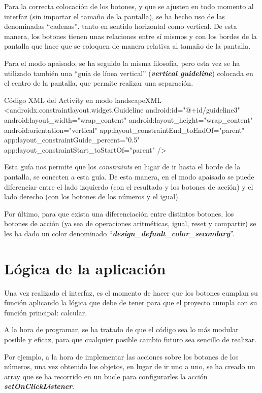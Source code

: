\documentclass{\ClassPath/viu-tfm-template}
\begin{document}
Para la correcta colocación de los botones, y que se ajusten en todo momento al interfaz (sin importar el tamaño de la pantalla), se ha hecho uso de las denominadas “cadenas”, tanto en sentido horizontal como vertical. De esta manera, los botones tienen unas relaciones entre sí mismos y con los bordes de la pantalla que hace que se coloquen de manera relativa al tamaño de la pantalla.

Para el modo apaisado, se ha seguido la misma filosofía, pero esta vez se ha utilizado también una “guía de línea vertical” (\textbf{\textit{vertical guideline}}) colocada en el centro de la pantalla, que permite realizar una separación.


\begin{mycode}{Código XML del Activity en modo landscape}{XML}{}
<androidx.constraintlayout.widget.Guideline
    android:id="@+id/guideline3"
    android:layout_width="wrap_content"
    android:layout_height="wrap_content"
    android:orientation="vertical"
    app:layout_constraintEnd_toEndOf="parent"
    app:layout_constraintGuide_percent="0.5"
    app:layout_constraintStart_toStartOf="parent" />
\end{mycode}

Esta guía nos permite que los \textit{constraints} en lugar de ir hasta el borde de la pantalla, se conecten a esta guía. De esta manera, en el modo apaisado se puede diferenciar entre el lado izquierdo (con el resultado y los botones de acción) y el lado derecho (con los botones de los números y el igual).

Por último, para que exista una diferenciación entre distintos botones, los botones de acción (ya sea de operaciones aritméticas, igual, reset y compartir) se les ha dado un color denominado “\textbf{\textit{design\_default\_color\_secondary}}”.


\section{Lógica de la aplicación}
Una vez realizado el interfaz, es el momento de hacer que los botones cumplan su función aplicando la lógica que debe de tener para que el proyecto cumpla con su función principal: calcular.

A la hora de programar, se ha tratado de que el código sea lo más modular posible y eficaz, para que cualquier posible cambio futuro sea sencillo de realizar.

Por ejemplo, a la hora de implementar las acciones sobre los botones de los números, una vez obtenido los objetos, en lugar de ir uno a uno, se ha creado un array que se ha recorrido en un bucle para configurarles la acción \textbf{\textit{setOnClickListener}}.
\end{document}

